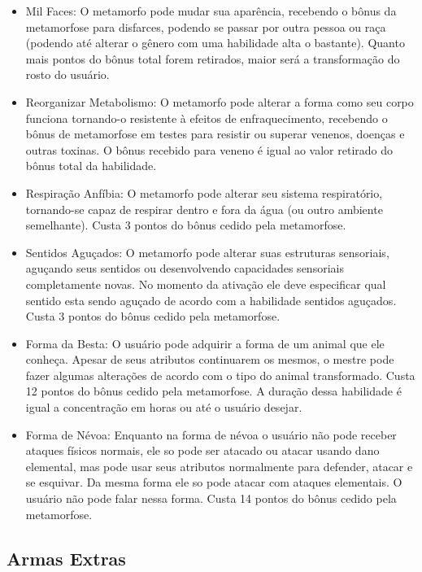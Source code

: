 \begin{itemize}
	\item 		Mil Faces: O metamorfo pode mudar sua aparência, recebendo o bônus da metamorfose para disfarces, podendo se passar por outra pessoa ou raça (podendo até alterar o gênero com uma habilidade alta o bastante). Quanto mais pontos do bônus total forem retirados, maior será a transformação do rosto do usuário.

	\item 		Reorganizar Metabolismo: O metamorfo pode alterar a forma como seu corpo funciona tornando-o resistente à efeitos de enfraquecimento, recebendo o bônus de metamorfose em testes para resistir ou superar venenos, doenças e outras toxinas. O bônus recebido para veneno é igual ao valor retirado do bônus total da habilidade.

	\item 		Respiração Anfíbia: O metamorfo pode alterar seu sistema respiratório, tornando-se capaz de respirar dentro e fora da água (ou outro ambiente semelhante). Custa 3 pontos do bônus cedido pela metamorfose.

	\item 		Sentidos Aguçados: O metamorfo pode alterar suas estruturas sensoriais, aguçando seus sentidos ou desenvolvendo capacidades sensoriais completamente novas. No momento da ativação ele deve especificar qual sentido esta sendo aguçado de acordo com a habilidade sentidos aguçados. Custa 3 pontos do bônus cedido pela metamorfose.
	
	\item 		Forma da Besta: O usuário pode adquirir a forma de um animal que ele conheça. Apesar de seus atributos continuarem os mesmos, o mestre pode fazer algumas alterações de acordo com o tipo do animal transformado. Custa 12 pontos do bônus cedido pela metamorfose. A duração dessa habilidade é igual a concentração em horas ou até o usuário desejar.
	
	\item 		Forma de Névoa: Enquanto na forma de névoa o usuário não pode receber ataques físicos normais, ele so pode ser atacado ou atacar usando dano elemental, mas pode usar seus atributos normalmente para defender, atacar e se esquivar. Da mesma forma ele so pode atacar com ataques elementais. O usuário não pode falar nessa forma. Custa 14 pontos do bônus cedido pela metamorfose.

\end{itemize}

 
 \subsection{Armas Extras}
 
